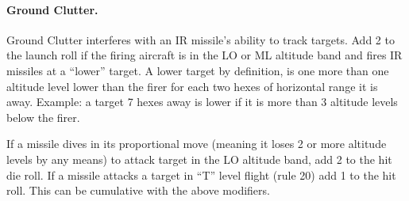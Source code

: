 \paragraph{Ground Clutter.}\label{rule:irm-ground-clutter} Ground Clutter interferes with an IR missile's ability to track targets. Add 2 to the launch roll if the firing aircraft is in the LO or ML altitude band and fires IR missiles at a “lower” target. A lower target by definition, is one more than one altitude level lower than the firer for each two hexes of horizontal range it is away. Example: a target 7 hexes away is lower if it is more than 3 altitude levels below the firer.

If a missile dives in its proportional move (meaning it loses 2 or more altitude levels by any means) to attack target in the LO altitude band, add 2 to the hit die roll. If a missile attacks a target in “T” level flight (rule 20) add 1 to the hit roll. This can be cumulative with the above modifiers.


